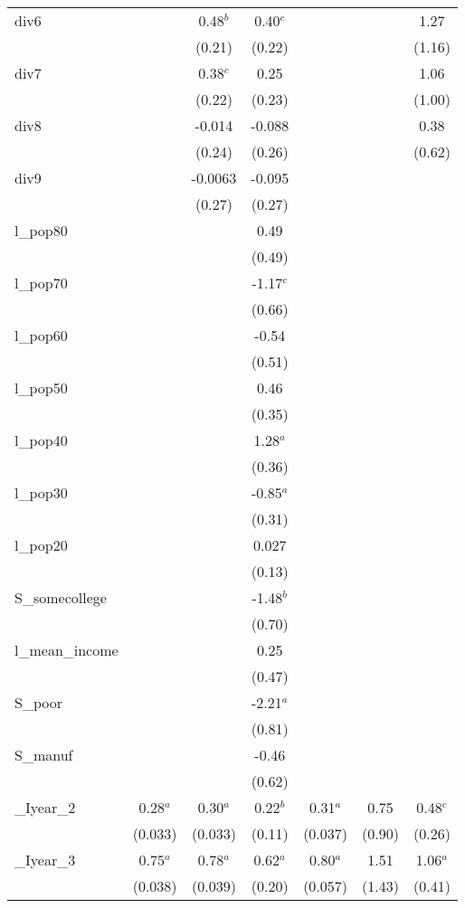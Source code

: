 \documentclass[]{article}
\begin{document}
\begin{tabular}{lcccccc}
div6 &  & 0.48$^b$ & 0.40$^c$ &  &  & 1.27 \\
 &  & (0.21) & (0.22) &  &  & (1.16) \\
div7 &  & 0.38$^c$ & 0.25 &  &  & 1.06 \\
 &  & (0.22) & (0.23) &  &  & (1.00) \\
div8 &  & -0.014 & -0.088 &  &  & 0.38 \\
 &  & (0.24) & (0.26) &  &  & (0.62) \\
div9 &  & -0.0063 & -0.095 &  &  &  \\
 &  & (0.27) & (0.27) &  &  &  \\
l\_pop80 &  &  & 0.49 &  &  &  \\
 &  &  & (0.49) &  &  &  \\
l\_pop70 &  &  & -1.17$^c$ &  &  &  \\
 &  &  & (0.66) &  &  &  \\
l\_pop60 &  &  & -0.54 &  &  &  \\
 &  &  & (0.51) &  &  &  \\
l\_pop50 &  &  & 0.46 &  &  &  \\
 &  &  & (0.35) &  &  &  \\
l\_pop40 &  &  & 1.28$^a$ &  &  &  \\
 &  &  & (0.36) &  &  &  \\
l\_pop30 &  &  & -0.85$^a$ &  &  &  \\
 &  &  & (0.31) &  &  &  \\
l\_pop20 &  &  & 0.027 &  &  &  \\
 &  &  & (0.13) &  &  &  \\
S\_somecollege &  &  & -1.48$^b$ &  &  &  \\
 &  &  & (0.70) &  &  &  \\
l\_mean\_income &  &  & 0.25 &  &  &  \\
 &  &  & (0.47) &  &  &  \\
S\_poor &  &  & -2.21$^a$ &  &  &  \\
 &  &  & (0.81) &  &  &  \\
S\_manuf &  &  & -0.46 &  &  &  \\
 &  &  & (0.62) &  &  &  \\
\_Iyear\_2 & 0.28$^a$ & 0.30$^a$ & 0.22$^b$ & 0.31$^a$ & 0.75 & 0.48$^c$ \\
 & (0.033) & (0.033) & (0.11) & (0.037) & (0.90) & (0.26) \\
\_Iyear\_3 & 0.75$^a$ & 0.78$^a$ & 0.62$^a$ & 0.80$^a$ & 1.51 & 1.06$^a$ \\
 & (0.038) & (0.039) & (0.20) & (0.057) & (1.43) & (0.41) \\

\end{tabular}
\end{document}
